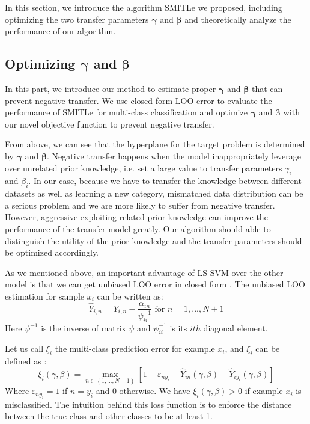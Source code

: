 In this section, we introduce the algorithm SMITLe we proposed, including optimizing the two transfer parameters $\boldsymbol{\gamma}$ and $\boldsymbol{\beta}$ and theoretically analyze the performance of our algorithm.
\subsection{Optimizing $\boldsymbol{\gamma}$ and $\boldsymbol{\beta}$}
In this part, we introduce our method to estimate proper $\boldsymbol{\gamma}$ and $\boldsymbol{\beta}$ that can prevent negative transfer. We use closed-form LOO error to evaluate the performance of SMITLe for multi-class classification and optimize $\boldsymbol{\gamma}$ and $\boldsymbol{\beta}$ with our novel objective function to prevent negative transfer.

From above, we can see that the hyperplane for the target problem is determined by $\boldsymbol{\gamma}$ and $\boldsymbol{\beta}$. Negative transfer happens when the model inappropriately leverage over unrelated prior knowledge, i.e. set a large value to transfer parameters $\gamma_i$ and $\beta_i$.  In our case, because we have to transfer the knowledge between different datasets as well as learning a new category, mismatched data distribution can be a serious problem and we are more likely to suffer from negative transfer. However, aggressive exploiting related prior knowledge can improve the performance of the transfer model greatly. Our algorithm should able to distinguish the utility of the prior knowledge and the transfer parameters should be optimized accordingly.

As we mentioned above, an important advantage of LS-SVM over the other model is that we can get unbiased LOO error in closed form \cite{cawley2006leave}. The unbiased LOO estimation for sample $x_i$ can be written as:
\begin{equation}
{\hat Y_{i,n}} = {Y_{i,n}} - \frac{{{\alpha _{in}}}}{{\psi_{ii}^{ - 1}}}{\text{    for   }}n = 1,...,N + 1
\end{equation}
Here $\psi^{-1}$ is the inverse of matrix $\psi$ and  $\psi_{ii}^{-1}$ is its $ith$ diagonal element. 

Let us call $\xi_i$ the multi-class prediction error for example $x_i$, and $\xi_i$ can be defined as \cite{crammer2002algorithmic}:
\begin{equation}\label{eq:train_loss}
\xi_i(\gamma,\beta) = \mathop {\max }\limits_{n \in \left\lbrace 1,...,N+1 \right\rbrace } {\left[ {1 - {\varepsilon _{n{y_i}}} + {{\hat Y}_{in}}\left( {\gamma ,\beta } \right) - {{\hat Y}_{i{y_i}}}\left( {\gamma ,\beta } \right)} \right]}
\end{equation}
Where $\varepsilon _{n{y_i}}=1$ if $n=y_i$ and 0 otherwise. We have $\xi_i(\gamma,\beta)>0$ if example $x_i$ is misclassified. The intuition behind this loss function is to enforce the distance between the true class and other classes to be at least 1.

